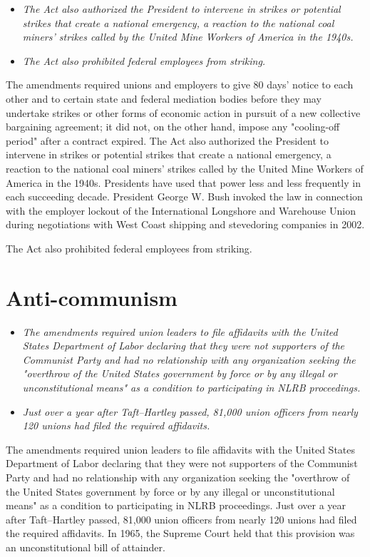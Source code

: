\begin{itemize}
\item
  \emph{The Act also authorized the President to intervene in strikes or
  potential strikes that create a national emergency, a reaction to the
  national coal miners' strikes called by the United Mine Workers of
  America in the 1940s.}
\item
  \emph{The Act also prohibited federal employees from striking.}
\end{itemize}

The amendments required unions and employers to give 80 days' notice to
each other and to certain state and federal mediation bodies before they
may undertake strikes or other forms of economic action in pursuit of a
new collective bargaining agreement; it did not, on the other hand,
impose any "cooling-off period" after a contract expired. The Act also
authorized the President to intervene in strikes or potential strikes
that create a national emergency, a reaction to the national coal
miners' strikes called by the United Mine Workers of America in the
1940s. Presidents have used that power less and less frequently in each
succeeding decade. President George W. Bush invoked the law in
connection with the employer lockout of the International Longshore and
Warehouse Union during negotiations with West Coast shipping and
stevedoring companies in 2002.

The Act also prohibited federal employees from striking.

\section{Anti-communism}\label{anti-communism}

\begin{itemize}
\item
  \emph{The amendments required union leaders to file affidavits with
  the United States Department of Labor declaring that they were not
  supporters of the Communist Party and had no relationship with any
  organization seeking the "overthrow of the United States government by
  force or by any illegal or unconstitutional means" as a condition to
  participating in NLRB proceedings.}
\item
  \emph{Just over a year after Taft--Hartley passed, 81,000 union
  officers from nearly 120 unions had filed the required affidavits.}
\end{itemize}

The amendments required union leaders to file affidavits with the United
States Department of Labor declaring that they were not supporters of
the Communist Party and had no relationship with any organization
seeking the "overthrow of the United States government by force or by
any illegal or unconstitutional means" as a condition to participating
in NLRB proceedings. Just over a year after Taft--Hartley passed, 81,000
union officers from nearly 120 unions had filed the required affidavits.
In 1965, the Supreme Court held that this provision was an
unconstitutional bill of attainder.

